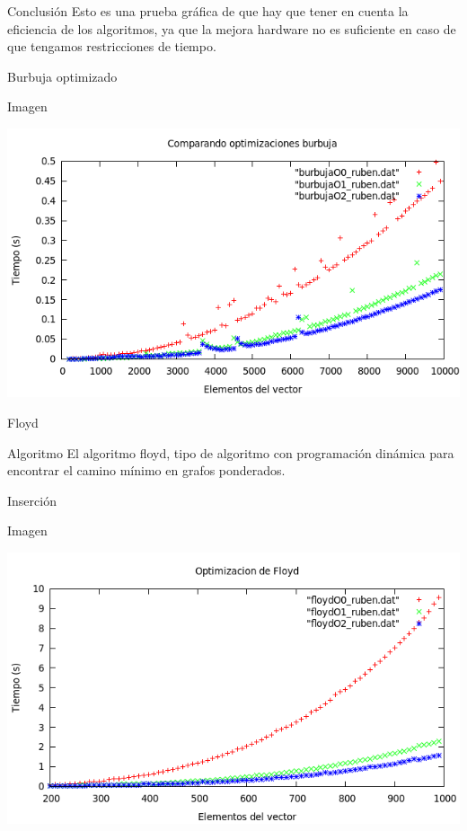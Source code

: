 \documentclass[compress]{beamer}
\begin{document}
\begin{frame}
	\begin{alertblock}{Conclusión}
	Esto es una prueba gráfica de que hay que tener en cuenta la eficiencia de los 				algoritmos, ya que la mejora hardware no es suficiente en caso de que tengamos 				restricciones de tiempo.
	\end{alertblock}
\end{frame}

\begin{frame}{Burbuja optimizado}
	\begin{alertblock}{Imagen}
	\begin{center}
	\includegraphics[scale=0.45]{../Graficas/Burbuja/burbuja_optimizacion.png}
	\end{center}
	\end{alertblock}
\end{frame}

\begin{frame}{Floyd}
	\begin{block}{Algoritmo}
	El algoritmo floyd, tipo de algoritmo con programación dinámica para encontrar el 			camino mínimo en grafos ponderados.
	\end{block}
\end{frame}

\begin{frame}{Inserción}
	\begin{alertblock}{Imagen}
	\begin{center}
	\includegraphics[scale=0.45]{../Graficas/Floyd/floyd_optimizacion.png}
	\end{center}
	\end{alertblock}
\end{frame}



\end{document}
